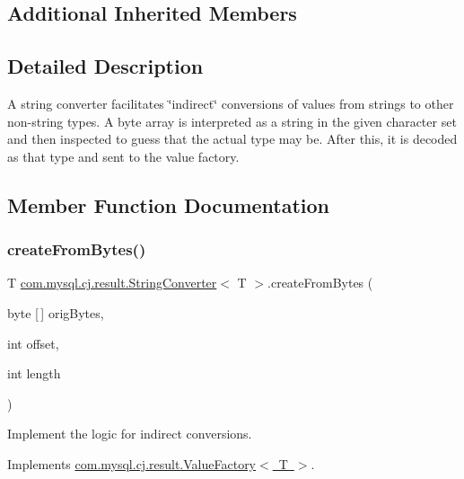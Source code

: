 \subsection*{Additional Inherited Members}


\subsection{Detailed Description}
A string converter facilitates \char`\"{}indirect\char`\"{} conversions of values from strings to other non-\/string types. A byte array is interpreted as a string in the given character set and then inspected to guess that the actual type may be. After this, it is decoded as that type and sent to the value factory. 

\subsection{Member Function Documentation}
\mbox{\label{classcom_1_1mysql_1_1cj_1_1result_1_1_string_converter_a62092d8d4f0919ee0c63e7b4caf29d5a}} 
\subsubsection{\texorpdfstring{create\+From\+Bytes()}{createFromBytes()}}
{\footnotesize\ttfamily T \mbox{\hyperlink{classcom_1_1mysql_1_1cj_1_1result_1_1_string_converter}{com.\+mysql.\+cj.\+result.\+String\+Converter}}$<$ T $>$.create\+From\+Bytes (\begin{DoxyParamCaption}\item[{byte \mbox{[}$\,$\mbox{]}}]{orig\+Bytes,  }\item[{int}]{offset,  }\item[{int}]{length }\end{DoxyParamCaption})}

Implement the logic for indirect conversions. 

Implements \mbox{\hyperlink{interfacecom_1_1mysql_1_1cj_1_1result_1_1_value_factory}{com.\+mysql.\+cj.\+result.\+Value\+Factory$<$ T $>$}}.

\mbox{\label{classcom_1_1mysql_1_1cj_1_1result_1_1_string_converter_ab43f945452ba741f823d67b68b3bade8}} 
